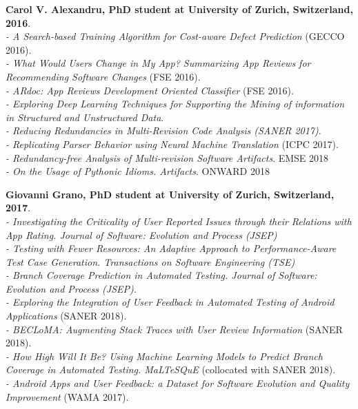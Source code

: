 \documentclass[10pt]{article}
\begin{document}
\begin{bibsection}
\item \textbf{Carol V. Alexandru, PhD student at University of Zurich, Switzerland, 2016}.\\
       \textit{- A Search-based Training Algorithm for Cost-aware Defect Prediction} (GECCO 2016).\\
              \textit{- What Would Users Change in My App? Summarizing App Reviews for Recommending Software Changes} (FSE 2016).\\
               \textit{- ARdoc: App Reviews Development Oriented Classifier} (FSE 2016).\\
        \textit{- Exploring Deep Learning Techniques for Supporting the Mining of information
        in Structured and Unstructured Data}.\\
        \textit{- Reducing Redundancies in Multi-Revision Code Analysis (SANER 2017)}. \\
        \textit{- Replicating Parser Behavior using Neural Machine Translation} (ICPC 2017).\\
        \textit{- Redundancy-free Analysis of Multi-revision Software Artifacts}.  EMSE 2018\\
        \textit{- On the Usage of Pythonic Idioms. Artifacts}.  ONWARD 2018\\
\item \textbf{Giovanni Grano, PhD student at University of Zurich, Switzerland, 2017}.\\ 
          \textit{- Investigating the Criticality of User Reported Issues through their Relations with App Rating. Journal of Software: Evolution and Process (JSEP)}  
                 \\   \textit{- Testing with Fewer Resources: An Adaptive Approach to Performance-Aware Test Case Generation.  Transactions on Software Engineering (TSE)} 
         \\  \textit{- Branch Coverage Prediction in Automated Testing.  Journal of Software: Evolution and Process (JSEP).} \\
         \textit{- Exploring the Integration of User Feedback in Automated Testing of Android Applications}  (SANER 2018).  \\  
         \textit{- BECLoMA: Augmenting Stack Traces with User Review Information}  (SANER 2018).  \\
         \textit{- How High Will It Be? Using Machine Learning Models to Predict Branch Coverage in Automated Testing.  \emph{MaLTeSQuE}}  (collocated with SANER 2018).  \\
       \textit{- Android Apps and User Feedback: a Dataset for Software Evolution and Quality Improvement}  (WAMA 2017). \\    
         

\end{bibsection}
\end{document}
